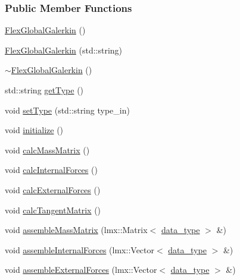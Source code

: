 \subsubsection*{Public Member Functions}
\begin{DoxyCompactItemize}
\item 
\hyperlink{classmknix_1_1_flex_global_galerkin_a29073fc9c4530cafc194be20b5a713be}{Flex\-Global\-Galerkin} ()
\item 
\hyperlink{classmknix_1_1_flex_global_galerkin_ac6b6f20633619ffb6e1d6e7d5782659f}{Flex\-Global\-Galerkin} (std\-::string)
\item 
\hyperlink{classmknix_1_1_flex_global_galerkin_af036ee6bdc4450fd457e0d95b22ace7c}{$\sim$\-Flex\-Global\-Galerkin} ()
\item 
std\-::string \hyperlink{classmknix_1_1_flex_global_galerkin_a31c93b0ce740217ce4cd12e71646d8cf}{get\-Type} ()
\item 
void \hyperlink{classmknix_1_1_flex_global_galerkin_ad731e1a7c510bbca6a49066386554e99}{set\-Type} (std\-::string type\-\_\-in)
\item 
void \hyperlink{classmknix_1_1_flex_global_galerkin_a24bad02ef3ea95123581550297ac82a0}{initialize} ()
\item 
void \hyperlink{classmknix_1_1_flex_global_galerkin_ae5bb8c27e7494b233a96d971833a0d0d}{calc\-Mass\-Matrix} ()
\item 
void \hyperlink{classmknix_1_1_flex_global_galerkin_ad9cbe937a3795ad5f9c5bd1990a14731}{calc\-Internal\-Forces} ()
\item 
void \hyperlink{classmknix_1_1_flex_global_galerkin_a2ed7079f0f2674c3556ff8dbbf3a63d3}{calc\-External\-Forces} ()
\item 
void \hyperlink{classmknix_1_1_flex_global_galerkin_a723916e65683c2ed77385ce0e3c3bd1a}{calc\-Tangent\-Matrix} ()
\item 
void \hyperlink{classmknix_1_1_flex_global_galerkin_a689a56babe9734eb504a9c948b6a3587}{assemble\-Mass\-Matrix} (lmx\-::\-Matrix$<$ \hyperlink{namespacemknix_a16be4b246fbf2cceb141e3a179111020}{data\-\_\-type} $>$ \&)
\item 
void \hyperlink{classmknix_1_1_flex_global_galerkin_a53478bc093d332f42128861a059c974c}{assemble\-Internal\-Forces} (lmx\-::\-Vector$<$ \hyperlink{namespacemknix_a16be4b246fbf2cceb141e3a179111020}{data\-\_\-type} $>$ \&)
\item 
void \hyperlink{classmknix_1_1_flex_global_galerkin_acc0254dbedc2543be9051aab1acb7d99}{assemble\-External\-Forces} (lmx\-::\-Vector$<$ \hyperlink{namespacemknix_a16be4b246fbf2cceb141e3a179111020}{data\-\_\-type} $>$ \&)

\end{DoxyCompactItemize}
